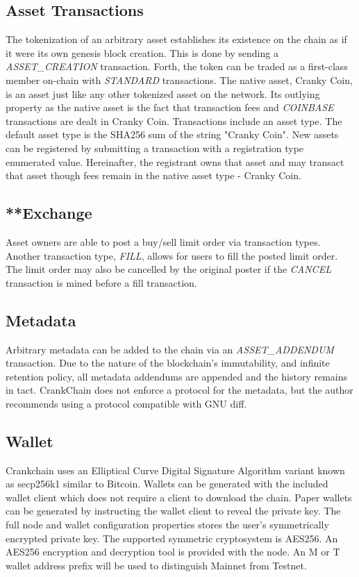 \documentclass[10pt,twocolumn]{article}
\begin{document}
\subsection{Asset Transactions}
The tokenization of an arbitrary asset establishes its existence on the chain as if it were its own genesis block creation.  This is done by sending a \textit{ASSET\_CREATION} transaction. Forth, the token can be traded as a first-class member on-chain with \textit{STANDARD} transactions.  The native asset, Cranky Coin, is an asset just like any other tokenized asset on the network.  Its outlying property as the native asset is the fact that transaction fees and \textit{COINBASE} transactions are dealt in Cranky Coin.
Transactions include an asset type.  The default asset type is the SHA256 sum of the string "Cranky Coin".  New assets can be registered by submitting a transaction with a registration type enumerated value.  Hereinafter, the registrant owns that asset and may transact that asset though fees remain in the native asset type - Cranky Coin.
\subsection{**Exchange}
Asset owners are able to post a buy/sell limit order via  transaction types.  Another transaction type, \textit{FILL}, allows for users to fill the posted limit order.  The limit order may also be cancelled by the original poster if the \textit{CANCEL} transaction is mined before a fill transaction.
\subsection{Metadata}
Arbitrary metadata can be added to the chain via an \textit{ASSET\_ADDENDUM}  transaction.
Due to the nature of the blockchain's immutability, and infinite retention policy, all metadata addendums are appended and the history remains in tact.  CrankChain does not enforce a protocol for the metadata, but the author recommends using a protocol compatible with GNU diff.
\subsection{Wallet}
Crankchain uses an Elliptical Curve Digital Signature Algorithm variant known as secp256k1 similar to Bitcoin. Wallets can be generated with the included wallet client which does not require a client to download the chain.  Paper wallets can be generated by instructing the wallet client to reveal the private key.  The full node and wallet configuration properties stores the user's symmetrically encrypted private key.  The supported symmetric cryptosystem is AES256.  An AES256 encryption and decryption tool is provided with the node.  An M or T wallet address prefix will be used to distinguish Mainnet from Testnet.
\end{document}
